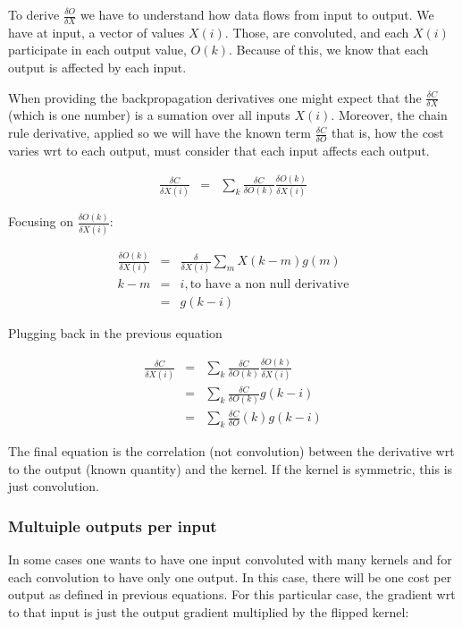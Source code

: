 \documentclass{article}
\begin{document}
To derive $\frac{\delta O}{\delta X}$ we have to understand how data flows from input to output. We have at input, a vector of values $X(i)$. Those, are convoluted, and each $X(i)$ participate in each output value, $O(k)$. Because of this, we know that each output is affected by each input.

When providing the backpropagation derivatives one might expect that the $\frac{\delta C}{\delta X}$ (which is one number) is a sumation over all inputs $X(i)$. Moreover, the chain rule derivative, applied so we will have the known term $\frac{\delta C}{\delta O}$ that is, how the cost varies wrt to each output, must consider that each input affects each output.

\begin{eqnarray}
	\frac{\delta C}{\delta X(i)}&=& \sum_{k}  \frac{\delta C}{\delta O(k)} \frac{\delta O(k)}{\delta X(i)}
\end{eqnarray}

Focusing on $\frac{\delta O(k)}{\delta X(i)}$:

\begin{eqnarray}
	\frac{\delta O(k)}{\delta X(i)}&=&\frac{\delta}{\delta X(i)} \sum_{m} X(k - m) g(m)\\
	k-m&=&i, \text{to have a non null derivative}\\
	&=&g(k-i)
\end{eqnarray}

Plugging back in the previous equation

\begin{eqnarray}
	\frac{\delta C}{\delta X(i)}&=& \sum_{k}  \frac{\delta C}{\delta O(k)} \frac{\delta O(k)}{\delta X(i)}\\
	&=&\sum_{k}\frac{\delta C}{\delta O(k)} g(k-i) \\
	&=&\sum_{k}\frac{\delta C}{\delta O}(k) g(k-i)
\end{eqnarray}

The final equation is the correlation (not convolution) between the derivative wrt to the output (known quantity) and the kernel. If the kernel is symmetric, this is just convolution.


\subsubsection{Multuiple outputs per input}

In some cases one wants to have one input convoluted with many kernels and for each convolution to have only one output. In this case, there will be one cost per output as defined in previous equations. For this particular case, the gradient wrt to that input is just the output gradient multiplied by the flipped kernel:
\end{document}
